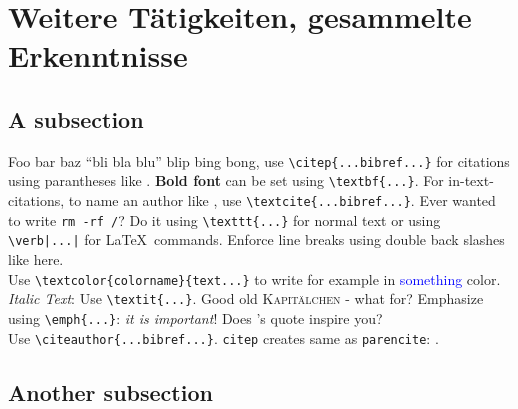\section{Weitere Tätigkeiten, gesammelte Erkenntnisse}
	\lipsum[12] %

	\subsection{A subsection}
	  Foo bar baz ``bli bla blu'' blip bing bong, use \verb|\citep{...bibref...}| for citations
	  using parantheses like \citep{DBLP:books/aw/Knuth73}.
	  \textbf{Bold font} can be set using \verb|\textbf{...}|.
	  For in-text-citations, to name an author like \textcite{DBLP:books/aw/Knuth73},
	  use \verb|\textcite{...bibref...}|. Ever wanted to
	  write \texttt{rm -rf /}? Do it using \verb|\texttt{...}| for normal text
	  or using \verb!\verb|...|! for \LaTeX\ commands. Enforce line breaks
	  using double back slashes like here.
	  \\
	  Use \verb|\textcolor{colorname}{text...}|
	  to write for example in \textcolor{blue}{something} color.
	  \\
	  \textit{Italic Text}: Use \verb|\textit{...}|.
	  Good old \textsc{Kapitälchen} - what for? Emphasize using \verb|\emph{...}|: \emph{it is important}!
	  Does \citeauthor{DBLP:books/aw/Knuth73}'s quote inspire you?
	  \\
	  Use \verb|\citeauthor{...bibref...}|.
	  \texttt{citep} creates same as \texttt{parencite}: \citep{DBLP:books/aw/Knuth73}.
	  \lipsum[13] %

  	\subsection{Another subsection}
    	\lipsum[1] %

